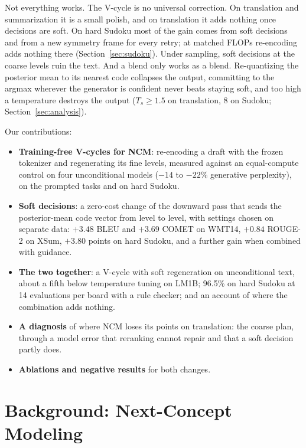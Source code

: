 \documentclass[11pt]{article}
\begin{document}
Not everything works. The V-cycle is no universal correction. On translation and summarization it is a small
polish, and on translation it adds nothing once decisions are soft. On hard Sudoku most of the gain comes from soft
decisions and from a new symmetry frame for every retry; at matched FLOPs re-encoding adds nothing there
(Section~\ref{sec:sudoku}). Under sampling, soft decisions at the coarse levels ruin the text. And a blend only works
as a blend.
Re-quantizing the posterior mean to its nearest code collapses the output, committing to the argmax wherever the
generator is confident never beats staying soft, and too high a temperature destroys the output ($T_s\ge1.5$ on
translation, 8 on Sudoku; Section~\ref{sec:analysis}).

Our contributions:
\begin{itemize}[leftmargin=*, topsep=4pt, itemsep=3pt, parsep=0pt]
\item \textbf{Training-free V-cycles for NCM}: re-encoding a draft with the frozen tokenizer and regenerating its fine
  levels, measured against an equal-compute control on four unconditional models ($-14$ to $-22\%$ generative
  perplexity), on the prompted tasks and on hard Sudoku.
\item \textbf{Soft decisions}: a zero-cost change of the downward pass that sends the posterior-mean code vector from
  level to level, with settings chosen on separate data: $+3.48$ BLEU and $+3.69$ COMET on WMT14, $+0.84$ ROUGE-2 on
  XSum, $+3.80$ points on hard Sudoku, and a further gain when combined with guidance.
\item \textbf{The two together}: a V-cycle with soft regeneration on unconditional text, about a fifth below
  temperature tuning on LM1B; 96.5\% on hard Sudoku at 14 evaluations per board with a rule checker; and an account
  of where the combination adds nothing.
\item \textbf{A diagnosis} of where NCM loses its points on translation: the coarse plan, through a model error
  that reranking cannot repair and that a soft decision partly does.
\item \textbf{Ablations and negative results} for both changes.
\end{itemize}

\section{Background: Next-Concept Modeling}
\label{sec:background}
\end{document}
